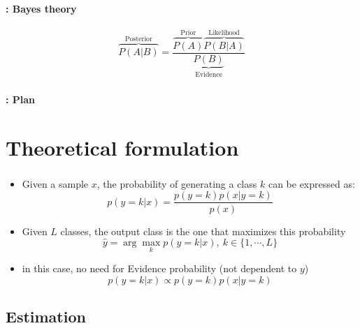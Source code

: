 \documentclass[xcolor=table]{beamer}
\subtitle[Naïve Bayes]{Naïve Bayes}
\begin{document}
\begin{frame}
	\frametitle{\inserttitle}
	\framesubtitle{\insertshortsubtitle: Bayes theory}
	\huge
	\[
	\overbrace{P(A|B)}^\text{Posterior} = \frac{\overbrace{P(A)}^\text{Prior} \overbrace{P(B|A)}^{\text{Likelihood}}}{\underbrace{P(B)}_\text{Evidence}}
	\]
\end{frame}

\begin{frame}
	\frametitle{\inserttitle}
	\framesubtitle{\insertshortsubtitle: Plan}

	\begin{multicols}{2}
		\tableofcontents
	\end{multicols}
\end{frame}

\section{Theoretical formulation}

\begin{frame}
	\frametitle{\insertshortsubtitle}
	\framesubtitle{\insertsection}
	
	\begin{itemize}
		\item Given a sample $ x $, the probability of generating a class $ k $ can be expressed as:
		\[p(y=k|x) = \frac{p(y=k) p(x|y=k)}{p(x)}\]
		\item Given $ L $ classes, the output class is the one that maximizes this probability
		\[\hat{y} = \arg\max_{k} p(y=k|x),\ k \in \{1, \cdots, L\} \]
		\item in this case, no need for Evidence probability (not dependent to $ y $)
		\[p(y=k|x) \propto p(y=k) p(x|y=k)\]
	\end{itemize}
	
\end{frame}

\subsection{Estimation}
\end{document}
